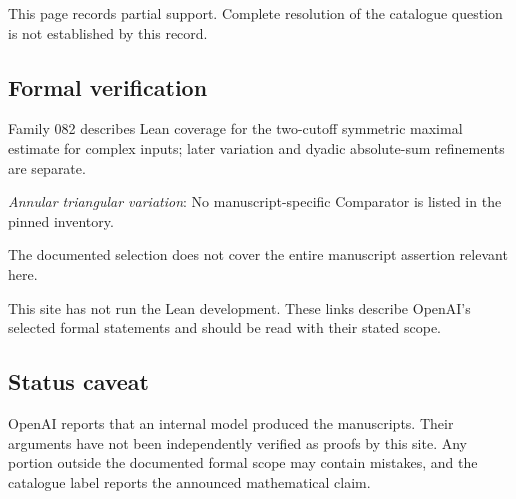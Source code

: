 \documentclass[11pt]{article}
\begin{document}
This page records partial support. Complete resolution of the catalogue question is not established by this record.

\subsection{Formal verification}
Family 082 describes Lean coverage for the two-cutoff symmetric maximal estimate for complex inputs; later variation and dyadic absolute-sum refinements are separate.

\textit{Annular triangular variation}: No manuscript-specific Comparator is listed in the pinned inventory.

The documented selection does not cover the entire manuscript assertion relevant here.

This site has not run the Lean development. These links describe OpenAI’s selected formal statements and should be read with their stated scope.

\subsection{Status caveat}
OpenAI reports that an internal model produced the manuscripts. Their arguments have not been independently verified as proofs by this site. Any portion outside the documented formal scope may contain mistakes, and the catalogue label reports the announced mathematical claim.
\end{document}
